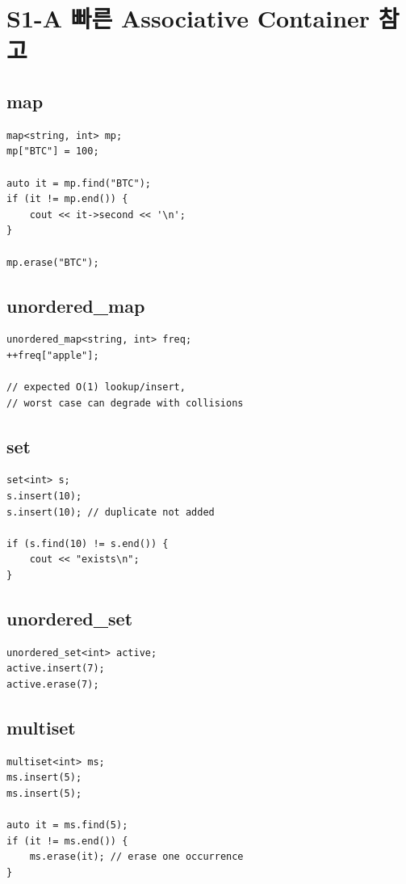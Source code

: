 \chapter{S1-A 빠른 Associative Container 참고}

\section{map}
\begin{lstlisting}
map<string, int> mp;
mp["BTC"] = 100;

auto it = mp.find("BTC");
if (it != mp.end()) {
    cout << it->second << '\n';
}

mp.erase("BTC");
\end{lstlisting}

\section{unordered\_map}
\begin{lstlisting}
unordered_map<string, int> freq;
++freq["apple"];

// expected O(1) lookup/insert,
// worst case can degrade with collisions
\end{lstlisting}

\section{set}
\begin{lstlisting}
set<int> s;
s.insert(10);
s.insert(10); // duplicate not added

if (s.find(10) != s.end()) {
    cout << "exists\n";
}
\end{lstlisting}

\section{unordered\_set}
\begin{lstlisting}
unordered_set<int> active;
active.insert(7);
active.erase(7);
\end{lstlisting}

\section{multiset}
\begin{lstlisting}
multiset<int> ms;
ms.insert(5);
ms.insert(5);

auto it = ms.find(5);
if (it != ms.end()) {
    ms.erase(it); // erase one occurrence
}
\end{lstlisting}

